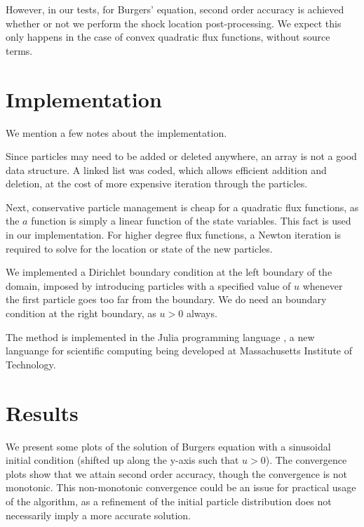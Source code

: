 \documentclass{article}
\begin{document}
However, in our tests, for Burgers' equation, second order accuracy is achieved whether or not we perform the shock location post-processing. We expect this only happens in the case of convex quadratic flux functions, without source terms.

\section{Implementation}
We mention a few notes about the implementation.

Since particles may need to be added or deleted anywhere, an array is not a good data structure. A linked list was coded, which allows efficient addition and deletion, at the cost of more expensive iteration through the particles.

Next, conservative particle management is cheap for a quadratic flux functions, as the $a$ function is simply a linear function of the state variables. This fact is used in our implementation. For higher degree flux functions, a Newton iteration is required to solve for the location or state of the new particles.

We implemented a Dirichlet boundary condition at the left boundary of the domain, imposed by introducing particles with a specified value of $u$ whenever the first particle goes too far from the boundary. We do need an boundary condition at the right boundary, as $u>0$ always.

The method is implemented in the Julia programming language \cite{julia}, a new languange for scientific computing being developed at Massachusetts Institute of Technology.

\section{Results}

We present some plots of the solution of Burgers equation with a sinusoidal initial condition (shifted up along the y-axis such that $u>0$). The convergence plots show that we attain second order accuracy, though the convergence is not monotonic. This non-monotonic convergence could be an issue for practical usage of the algorithm, as a refinement of the initial particle distribution does not necessarily imply a more accurate solution.
\end{document}
